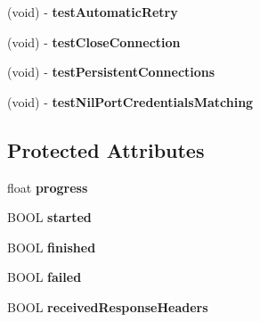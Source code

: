 \begin{DoxyCompactItemize}
\item 
\hypertarget{interface_a_s_i_h_t_t_p_request_tests_aed737183009eb013ed056fb74423c9ab}{
(void) -\/ {\bfseries test\-Automatic\-Retry}}
\label{interface_a_s_i_h_t_t_p_request_tests_aed737183009eb013ed056fb74423c9ab}

\item 
\hypertarget{interface_a_s_i_h_t_t_p_request_tests_a266591fd53dafdd64e6b175e59f1439c}{
(void) -\/ {\bfseries test\-Close\-Connection}}
\label{interface_a_s_i_h_t_t_p_request_tests_a266591fd53dafdd64e6b175e59f1439c}

\item 
\hypertarget{interface_a_s_i_h_t_t_p_request_tests_a23d2a0e836cb5aa242ee26182047fc6b}{
(void) -\/ {\bfseries test\-Persistent\-Connections}}
\label{interface_a_s_i_h_t_t_p_request_tests_a23d2a0e836cb5aa242ee26182047fc6b}

\item 
\hypertarget{interface_a_s_i_h_t_t_p_request_tests_acbb0b3611836a7e04e7fe0b1072e0977}{
(void) -\/ {\bfseries test\-Nil\-Port\-Credentials\-Matching}}
\label{interface_a_s_i_h_t_t_p_request_tests_acbb0b3611836a7e04e7fe0b1072e0977}

\end{DoxyCompactItemize}
\subsection*{\-Protected \-Attributes}
\begin{DoxyCompactItemize}
\item 
\hypertarget{interface_a_s_i_h_t_t_p_request_tests_af45f002d473b38f9602c0ea3ca5223fa}{
float {\bfseries progress}}
\label{interface_a_s_i_h_t_t_p_request_tests_af45f002d473b38f9602c0ea3ca5223fa}

\item 
\hypertarget{interface_a_s_i_h_t_t_p_request_tests_af984a530c8d6aa8aff36a7859206d51e}{
\-B\-O\-O\-L {\bfseries started}}
\label{interface_a_s_i_h_t_t_p_request_tests_af984a530c8d6aa8aff36a7859206d51e}

\item 
\hypertarget{interface_a_s_i_h_t_t_p_request_tests_aba1e3755baec640bc1c53e477ed6ff4e}{
\-B\-O\-O\-L {\bfseries finished}}
\label{interface_a_s_i_h_t_t_p_request_tests_aba1e3755baec640bc1c53e477ed6ff4e}

\item 
\hypertarget{interface_a_s_i_h_t_t_p_request_tests_aebb514a3d7576a0d59eb648956a9b6f8}{
\-B\-O\-O\-L {\bfseries failed}}
\label{interface_a_s_i_h_t_t_p_request_tests_aebb514a3d7576a0d59eb648956a9b6f8}

\item 
\hypertarget{interface_a_s_i_h_t_t_p_request_tests_ac9069dccc74ba921dfb2543c2ed7ecba}{
\-B\-O\-O\-L {\bfseries received\-Response\-Headers}}
\label{interface_a_s_i_h_t_t_p_request_tests_ac9069dccc74ba921dfb2543c2ed7ecba}

\end{DoxyCompactItemize}
